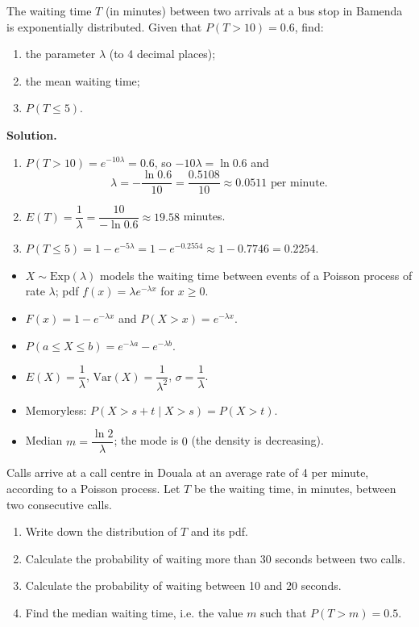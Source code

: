 \documentclass[11pt]{article}
\newcommand{\cle}[1]{{\popxbold\color{popdark}#1}}
\begin{document}
\begin{exoresolu}
The waiting time $T$ (in minutes) between two arrivals at a bus stop in Bamenda is exponentially distributed. Given that $P(T > 10) = 0.6$, find:
\begin{enumerate}
\item[(a)] the parameter $\lambda$ (to 4 decimal places);
\item[(b)] the mean waiting time;
\item[(c)] $P(T \le 5)$.
\end{enumerate}
\tcblower
\textbf{Solution.}
\begin{enumerate}
\item[(a)] $P(T > 10) = e^{-10\lambda} = 0.6$, so $-10\lambda = \ln 0.6$ and
\[ \lambda = -\frac{\ln 0.6}{10} = \frac{0.5108}{10} \approx 0.0511 \text{ per minute}. \]
\item[(b)] $E(T) = \dfrac{1}{\lambda} = \dfrac{10}{-\ln 0.6} \approx 19.58$ minutes.
\item[(c)] $P(T \le 5) = 1 - e^{-5\lambda} = 1 - e^{-0.2554} \approx 1 - 0.7746 = 0.2254$.
\end{enumerate}
\end{exoresolu}

\begin{aretenir}
\begin{itemize}
\item $X \sim \mathrm{Exp}(\lambda)$ models the \cle{waiting time} between events of a Poisson process of rate $\lambda$; pdf $f(x) = \lambda e^{-\lambda x}$ for $x \ge 0$.
\item $F(x) = 1 - e^{-\lambda x}$ and $P(X > x) = e^{-\lambda x}$.
\item $P(a \le X \le b) = e^{-\lambda a} - e^{-\lambda b}$.
\item $E(X) = \dfrac{1}{\lambda}$, \quad $\mathrm{Var}(X) = \dfrac{1}{\lambda^2}$, \quad $\sigma = \dfrac{1}{\lambda}$.
\item Memoryless: $P(X > s+t \mid X > s) = P(X > t)$.
\item Median $m = \dfrac{\ln 2}{\lambda}$; the mode is $0$ (the density is decreasing).
\end{itemize}
\end{aretenir}

\begin{exercice}
Calls arrive at a call centre in Douala at an average rate of 4 per minute, according to a Poisson process. Let $T$ be the waiting time, in minutes, between two consecutive calls.
\begin{enumerate}
\item[(a)] Write down the distribution of $T$ and its pdf.
\item[(b)] Calculate the probability of waiting more than 30 seconds between two calls.
\item[(c)] Calculate the probability of waiting between 10 and 20 seconds.
\item[(d)] Find the median waiting time, i.e. the value $m$ such that $P(T > m) = 0.5$.
\end{enumerate}
\end{exercice}
\end{document}
